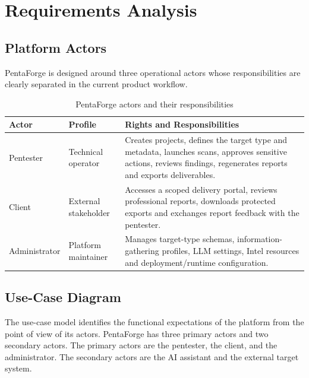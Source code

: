 \documentclass[12pt,a4paper]{report}
\begin{document}
\section{Requirements Analysis}
\label{sec:requirements}

\subsection{Platform Actors}

PentaForge is designed around three operational actors whose responsibilities are
clearly separated in the current product workflow.

\begin{table}[H]
    \centering
    \renewcommand{\arraystretch}{1.35}
    \begin{tabular}{|p{}|p{}|p{}|}
        \hline
        \textbf{Actor} & \textbf{Profile} & \textbf{Rights and Responsibilities} \\
        \hline
        Pentester & Technical operator & Creates projects, defines the target type
        and metadata, launches scans, approves sensitive actions, reviews findings,
        regenerates reports and exports deliverables. \\
        \hline
        Client & External stakeholder & Accesses a scoped delivery portal, reviews
        professional reports, downloads protected exports and exchanges report
        feedback with the pentester. \\
        \hline
        Administrator & Platform maintainer & Manages target-type schemas,
        information-gathering profiles, LLM settings, Intel resources and
        deployment/runtime configuration. \\
        \hline
    \end{tabular}
    \caption{PentaForge actors and their responsibilities}
    \label{tab:actors}
\end{table}

\subsection{Use-Case Diagram}

The use-case model identifies the functional expectations of the platform from the
point of view of its actors. PentaForge has three primary actors and two secondary
actors. The primary actors are the pentester, the client, and the administrator.
The secondary actors are the AI assistant and the external target system.
\end{document}
